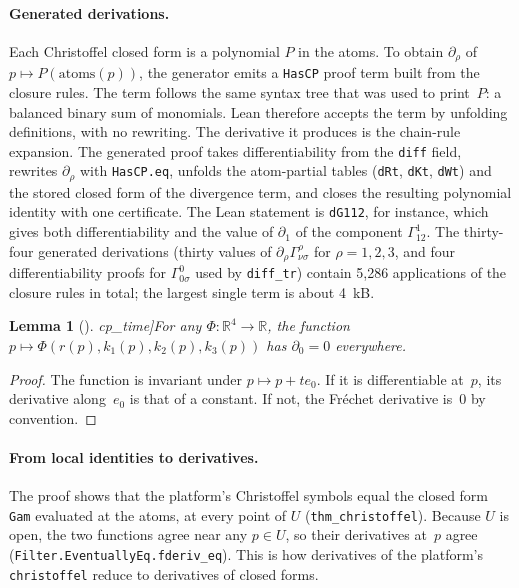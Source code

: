 \documentclass[11pt]{article}
\newtheorem{lemma}[theorem]{Lemma}
\theoremstyle{definition}
\theoremstyle{remark}
\newcommand{\R}{\mathbb{R}}
\newcommand{\lean}[1]{\lstinline[basicstyle=\ttfamily\normalsize,columns=fullflexible,breaklines=false]{#1}}
\begin{document}
\paragraph{Generated derivations.}
Each Christoffel closed form is a polynomial $P$ in the atoms.
To obtain $\partial_\rho$ of $p\mapsto P(\text{atoms}(p))$, the generator emits a \lean{HasCP} proof term built from the closure rules.
The term follows the same syntax tree that was used to print~$P$: a balanced binary sum of monomials.
Lean therefore accepts the term by unfolding definitions, with no rewriting.
The derivative it produces is the chain-rule expansion.
The generated proof takes differentiability from the \lean{diff} field, rewrites $\partial_\rho$ with \lean{HasCP.eq}, unfolds the atom-partial tables (\lean{dRt}, \lean{dKt}, \lean{dWt}) and the stored closed form of the divergence term, and closes the resulting polynomial identity with one certificate.
The Lean statement is \lean{dG112}, for instance, which gives both differentiability and the value of $\partial_1$ of the component $\Gamma^1_{12}$.
The thirty-four generated derivations (thirty values of $\partial_\rho\Gamma^\rho_{\nu\sigma}$ for $\rho=1,2,3$, and four differentiability proofs for $\Gamma^0_{0\sigma}$ used by \lean{diff_tr}) contain 5{,}286 applications of the closure rules in total; the largest single term is about 4~kB.

\begin{lemma}[\lean{cp_time}]\label{lem:time}
For any $\Phi:\R^4\to\R$, the function $p\mapsto\Phi(r(p),k_1(p),k_2(p),k_3(p))$ has $\partial_0=0$ everywhere.
\end{lemma}
\begin{proof}
The function is invariant under $p\mapsto p+t e_0$.
If it is differentiable at~$p$, its derivative along~$e_0$ is that of a constant.
If not, the Fr\'echet derivative is~$0$ by convention.
\end{proof}

\paragraph{From local identities to derivatives.}
The proof shows that the platform's Christoffel symbols equal the closed form \lean{Gam} evaluated at the atoms, at every point of $U$ (\lean{thm_christoffel}).
Because $U$ is open, the two functions agree near any $p\in U$, so their derivatives at~$p$ agree (\lean{Filter.EventuallyEq.fderiv_eq}).
This is how derivatives of the platform's \lean{christoffel} reduce to derivatives of closed forms.
\end{document}
